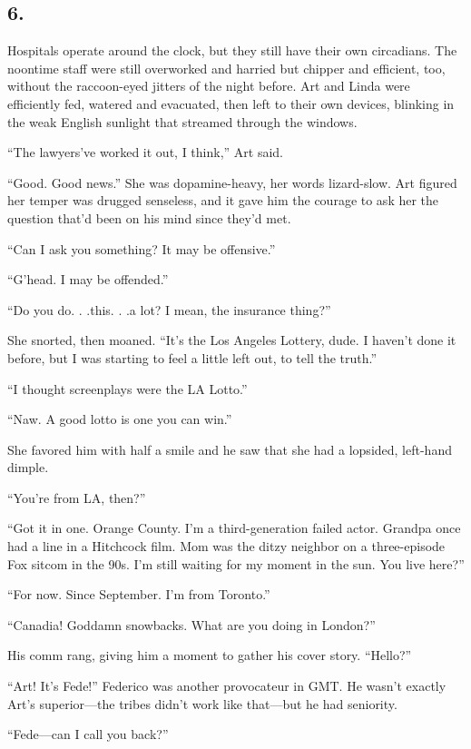 \subsection{6.}

Hospitals operate around the clock, but they still have their own
circadians. The noontime staff were still overworked and harried
but chipper and efficient, too, without the raccoon-eyed jitters of
the night before. Art and Linda were efficiently fed, watered and
evacuated, then left to their own devices, blinking in the weak
English sunlight that streamed through the windows.

“The lawyers’ve worked it out, I think,” Art said.

“Good. Good news.” She was dopamine-heavy, her words lizard-slow.
Art figured her temper was drugged senseless, and it gave him the
courage to ask her the question that’d been on his mind since
they’d met.

“Can I ask you something? It may be offensive.”

“G’head. I may be offended.”

“Do you do. . .this. . .a lot? I mean, the insurance thing?”

She snorted, then moaned. “It’s the Los Angeles Lottery, dude. I
haven’t done it before, but I was starting to feel a little left
out, to tell the truth.”

“I thought screenplays were the LA Lotto.”

“Naw. A good lotto is one you can win.”

She favored him with half a smile and he saw that she had a
lopsided, left-hand dimple.

“You’re from LA, then?”

“Got it in one. Orange County. I’m a third-generation failed actor.
Grandpa once had a line in a Hitchcock film. Mom was the ditzy
neighbor on a three-episode Fox sitcom in the 90s. I’m still
waiting for my moment in the sun. You live here?”

“For now. Since September. I’m from Toronto.”

“Canadia! Goddamn snowbacks. What are you doing in London?”

His comm rang, giving him a moment to gather his cover story.
“Hello?”

“Art! It’s Fede!” Federico was another provocateur in GMT. He
wasn’t exactly Art’s superior—the tribes didn’t work like that—but
he had seniority.

“Fede—can I call you back?”

